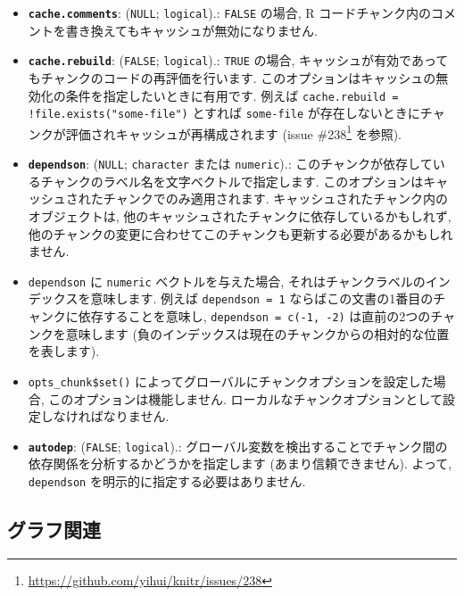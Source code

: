 \documentclass[
  11pt,
]{bxjsreport}
\renewcommand{\href}[2]{#2\footnote{\url{#1}}}
\begin{document}
\begin{itemize}
\item
  \textbf{\texttt{cache.comments}}: (\texttt{NULL}; \texttt{logical}).: \texttt{FALSE} の場合, R コードチャンク内のコメントを書き換えてもキャッシュが無効になりません.
\item
  \textbf{\texttt{cache.rebuild}}: (\texttt{FALSE}; \texttt{logical}).: \texttt{TRUE} の場合, キャッシュが有効であってもチャンクのコードの再評価を行います. このオプションはキャッシュの無効化の条件を指定したいときに有用です. 例えば \texttt{cache.rebuild = !file.exists("some-file")} とすれば \texttt{some-file} が存在しないときにチャンクが評価されキャッシュが再構成されます (issue \href{https://github.com/yihui/knitr/issues/238}{\#238} を参照).
\item
  \textbf{\texttt{dependson}}: (\texttt{NULL}; \texttt{character} または \texttt{numeric}).: このチャンクが依存しているチャンクのラベル名を文字ベクトルで指定します. このオプションはキャッシュされたチャンクでのみ適用されます. キャッシュされたチャンク内のオブジェクトは, 他のキャッシュされたチャンクに依存しているかもしれず, 他のチャンクの変更に合わせてこのチャンクも更新する必要があるかもしれません.
\item
  \texttt{dependson} に \texttt{numeric} ベクトルを与えた場合, それはチャンクラベルのインデックスを意味します. 例えば \texttt{dependson = 1} ならばこの文書の1番目のチャンクに依存することを意味し, \texttt{dependson = c(-1, -2)} は直前の2つのチャンクを意味します (負のインデックスは現在のチャンクからの相対的な位置を表します).
\item
  \texttt{opts\_chunk\$set()} によってグローバルにチャンクオプションを設定した場合, このオプションは機能しません. ローカルなチャンクオプションとして設定しなければなりません.
\item
  \textbf{\texttt{autodep}}: (\texttt{FALSE}; \texttt{logical}).: グローバル変数を検出することでチャンク間の依存関係を分析するかどうかを指定します (あまり信頼できません). よって, \texttt{dependson} を明示的に指定する必要はありません.
\end{itemize}

\hypertarget{plots}{%
\subsection{グラフ関連}\label{plots}}
\end{document}
